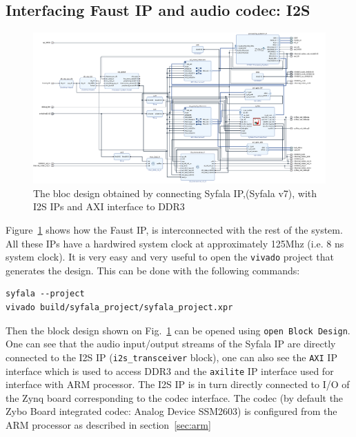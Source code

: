 \documentclass[11pt]{article}
\numberwithin{equation}{section}
\numberwithin{figure}{section}
\newcommand{\syfala}{{Syfala}\xspace}
\begin{document}
\subsection{Interfacing Faust IP and audio codec: I2S}
\begin{figure}[ht]
  \centerline{\includegraphics[width=16cm]{design_v7.png}}
  \caption{The bloc design obtained by connecting Syfala IP,(\syfala v7), with I2S IPs and AXI interface to DDR3}
  \label{fig:design_6_3}
\end{figure}

Figure~\ref{fig:design_6_3} shows how the Faust IP, is interconnected with the rest of the system. All these IPs have a hardwired system clock at approximately 125Mhz (i.e. 8 ns system clock). It is very easy and very useful to open the {\tt vivado} project that generates the design. This can be done with the following commands:\\
\begin{verbatim}
syfala --project
vivado build/syfala_project/syfala_project.xpr 
\end{verbatim}
Then the  block design shown on Fig.~\ref{fig:design_6_3} can be opened using {\tt open Block Design}. One can see that the audio input/output streams of the Syfala IP are directly connected to the I2S IP ({\tt i2s\_transceiver} block), one can also see the {\tt AXI} IP interface which is used to access DDR3 and the {\tt axilite} IP interface used for interface with ARM processor.  The I2S IP is in turn directly connected to I/O of the Zynq board corresponding to the codec interface. The codec (by default the Zybo Board  integrated codec: Analog Device SSM2603) is configured from the ARM processor as described in section~\ref{sec:arm}



\end{document}
